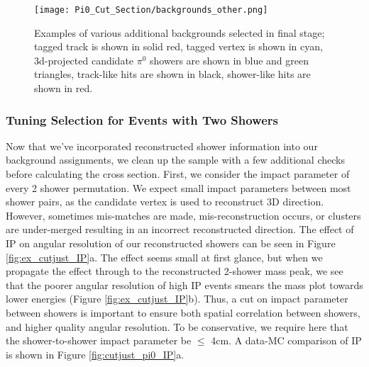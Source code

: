 \begin{figure}[H]
\centering
\texttt{[image: Pi0\_Cut\_Section/backgrounds\_other.png]}
\caption{ Examples of various additional backgrounds selected in final stage; tagged track is shown in solid red, tagged vertex is shown in cyan, 3d-projected candidate $\pi^0$ showers are shown in blue and green triangles, track-like hits are shown in black, shower-like hits are shown in red. }
\label{fig:backgrounds_other}
\end{figure}

\subsubsection{Tuning Selection for Events with Two Showers}
Now that we've incorporated reconstructed shower information into our background assignments, we clean up the sample with a few additional checks before calculating the cross section.  First, we consider the impact parameter of every 2 shower permutation.  We expect small impact parameters between most shower pairs, as the candidate vertex is used to reconstruct 3D direction. However, sometimes mis-matches are made, mis-reconstruction occurs, or clusters are under-merged resulting in an incorrect reconstructed direction. The effect of IP on angular resolution of our reconstructed showers can be seen in Figure \ref{fig:ex_cutjust_IP}a. The effect seems small at first glance, but when we propagate the effect through to the reconstructed 2-shower mass peak, we see that the poorer angular resolution of high IP events smears the mass plot towards lower energies (Figure \ref{fig:ex_cutjust_IP}b). Thus, a cut on impact parameter between showers is important to ensure both spatial correlation between showers, and higher quality angular resolution.  To be conservative, we require here that the shower-to-shower impact parameter be $\leq$ 4cm.  A data-MC comparison of IP is shown in Figure \ref{fig:cutjust_pi0_IP}a. 


